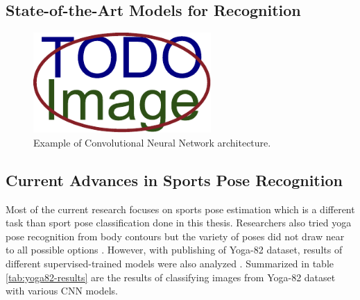 \subsection{State-of-the-Art Models for Recognition}

\blindtext




\begin{figure}[ht]\centering
    \centering
    \includegraphics[width=\linewidth,height=1.5in]{figures/placeholder.pdf}
    \caption{Example of Convolutional Neural Network architecture.}
    \label{fig:cnn-example}
\end{figure}

\blindtext

\blindtext

\blindtext

\blindtext

\subsection{Current Advances in Sports Pose Recognition}

Most of the current research focuses on sports pose estimation which is a different task than sport pose classification done in this thesis. Researchers also tried yoga pose recognition from body contours but the variety of poses did not draw near to all possible options \cite{yoga-posture-recognition}. However, with publishing of Yoga-82 dataset, results of different supervised-trained models were also analyzed \cite{verma2020yoga}. Summarized in table \ref{tab:yoga82-results} are the results of classifying images from Yoga-82 dataset with various CNN models.

